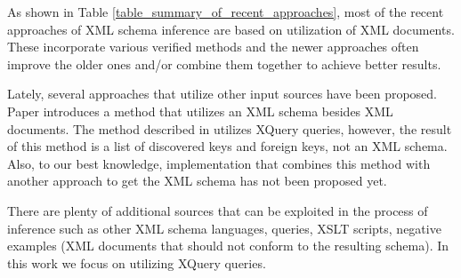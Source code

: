 As shown in Table \ref{table_summary_of_recent_approaches}, most of the recent approaches of XML schema inference are based on utilization of XML documents. These incorporate various verified methods and the newer approaches often improve the older ones and/or combine them together to achieve better results.

Lately, several approaches that utilize other input sources have been proposed. Paper \cite{Mlynkova:2009:IXS:1862681.1862693} introduces a method that utilizes an XML schema besides XML documents. The method described in \cite{Necasky:2009:DXK:1529282.1529414} utilizes XQuery queries, however, the result of this method is a list of discovered keys and foreign keys, not an XML schema. Also, to our best knowledge, implementation that combines this method with another approach to get the XML schema has not been proposed yet.

There are plenty of additional sources that can be exploited in the process of inference such as other XML schema languages, queries, XSLT scripts, negative examples (XML documents that should not conform to the resulting schema). In this work we focus on utilizing XQuery queries.